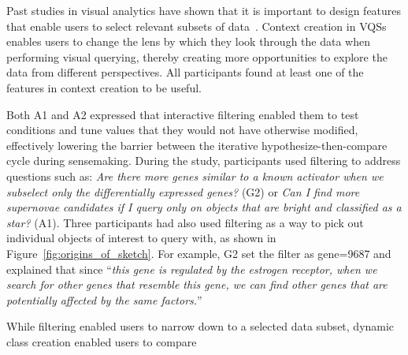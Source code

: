 \par Past studies in visual analytics 
have shown that it is important to design features 
that enable users to select relevant subsets of data~\cite{Amar2005,Heer2012}. 
Context creation in VQSs enables users to change the lens 
by which they look through the data 
when performing visual querying, 
thereby creating more opportunities 
to explore the data from different perspectives. 
All participants found at least 
one of the features in context creation to be useful.
\par Both A1 and A2 expressed that 
interactive filtering enabled 
them to test conditions and tune values 
that they would not have otherwise modified, 
effectively lowering the barrier between 
the iterative hypothesize-then-compare cycle during sensemaking.
During the study, participants used filtering 
to address questions such as: 
\textit{Are there more genes similar 
to a known activator when we subselect 
only the differentially expressed genes?} (G2) or \textit{Can I find more supernovae candidates if I query only on objects that are bright and classified as a star?} (A1). Three participants had also used filtering as a way to pick out individual objects of interest to query with, as shown in Figure~\ref{fig:origins_of_sketch}. For example, G2 set the filter as gene=9687 and explained that since ``\textit{this gene is regulated by the estrogen receptor, when we search for other genes that resemble this gene, we can find other genes that are potentially affected by the same factors.}''
\par While filtering enabled users to 
narrow down to a selected data subset, 
dynamic class creation enabled users to compare 
